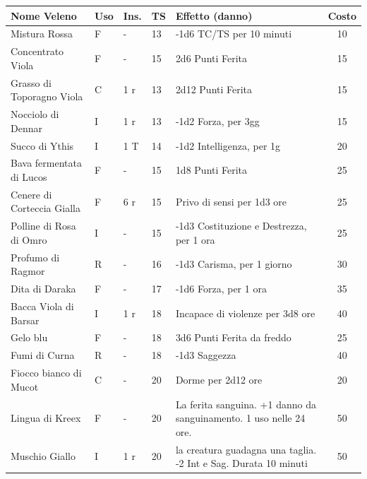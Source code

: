 \noindent\begin{tabularx}{1\textwidth}{m{4.8cm}lllm{6.5cm}c}
	\toprule
	\textbf{Nome Veleno} & \textbf{Uso} & \textbf{Ins.} & \textbf{TS} & \textbf{Effetto (danno)} & \textbf{Costo}\\
	\midrule
	Mistura Rossa \index{Mistura Rossa} & F& -& 13& -1d6 TC/TS per 10 minuti & 10\\
	\midrule
	Concentrato Viola \index{Concentrato Viola} & F& -& 15& 2d6 Punti Ferita & 15\\
	\midrule
	Grasso di Toporagno Viola \index{Grasso di Toporagno Viola} & C& 1 r& 13& 2d12 Punti Ferita & 15\\
	\midrule
	Nocciolo di Dennar \index{Nocciolo di Dennar}& I& 1 r& 13& -1d2 Forza, per 3gg& 15\\
	\midrule
	Succo di Ythis\index{Succo di Ythis} & I& 1 T& 14& -1d2 Intelligenza, per 1g& 20\\
	\midrule
	Bava fermentata di Lucos \index{Bava fermentata di Lucos}\label{bavadilucos}\hypertarget{bavadilucos}{}& F& - & 15& 1d8 Punti Ferita& 25\\
	\midrule
	Cenere di Corteccia Gialla \index{Cenere di Corteccia Gialla} & F& 6 r& 15& Privo di sensi per 1d3 ore& 25\\
	\midrule
	Polline di Rosa di Omro\index{Polline di Rosa di Omro} & I& - & 15& -1d3 Costituzione e Destrezza, per 1 ora & 25\\
	\midrule
	Profumo di Ragmor \index{Profumo di Ragmor}& R& - & 16& -1d3 Carisma, per 1 giorno & 30\\
	\midrule
	Dita di Daraka\index{Dita di Daraka} & F& - & 17& -1d6 Forza, per 1 ora & 35\\
	\midrule
	Bacca Viola di Barsar\index{Bacca Viola di Barsar}& I& 1 r& 18& Incapace di violenze per 3d8 ore& 40 \\
	\midrule
	Gelo blu \index{Gelo blu} & F& -& 18& 3d6 Punti Ferita da freddo& 25\\
	\midrule
	Fumi di Curna\index{Fumi di Curna} & R& - & 18& -1d3 Saggezza & 40\\
	\midrule
	Fiocco bianco di Mucot \index{Fiocco bianco di Mucot}& C& - & 20& Dorme per 2d12 ore& 20\\
	\midrule
	Lingua di Kreex \index{Lingua di Kreex} & F& - & 20& La ferita sanguina. +1 danno da sanguinamento. 1 uso nelle 24 ore. & 50 \\
	\midrule
	Muschio Giallo \index{Muschio Giallo}& I& 1 r& 20& la creatura guadagna una taglia. -2 Int e Sag. Durata 10 minuti& 50\\

\end{tabularx}
